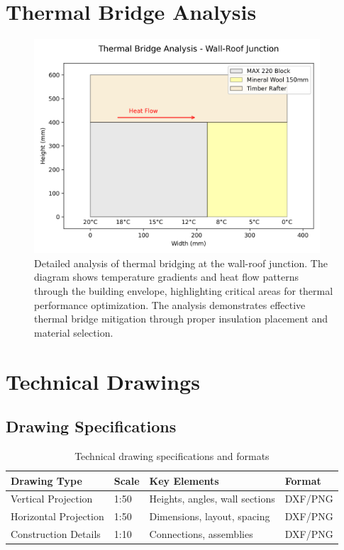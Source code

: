 \documentclass[12pt,a4paper]{article}
\begin{document}
\section{Thermal Bridge Analysis}
\begin{figure}[H]
    \centering
    \includegraphics[width=0.95\textwidth]{cad_project/enhanced_exports/screenshots/thermal_bridge.png}
    \caption{Detailed analysis of thermal bridging at the wall-roof junction.
    The diagram shows temperature gradients and heat flow patterns through the building envelope,
    highlighting critical areas for thermal performance optimization.
    The analysis demonstrates effective thermal bridge mitigation through proper insulation placement and material selection.}
    \label{fig:thermal_bridge}
\end{figure}

\section{Technical Drawings}

\subsection{Drawing Specifications}
\begin{table}[H]
    \centering
    \begin{tabular}{llll}
        \toprule
        \textbf{Drawing Type} & \textbf{Scale} & \textbf{Key Elements} & \textbf{Format} \\
        \midrule
        Vertical Projection & 1:50 & Heights, angles, wall sections & DXF/PNG \\
        Horizontal Projection & 1:50 & Dimensions, layout, spacing & DXF/PNG \\
        Construction Details & 1:10 & Connections, assemblies & DXF/PNG \\
        \bottomrule
    \end{tabular}
    \caption{Technical drawing specifications and formats}
    \label{tab:drawings}
\end{table}
\end{document}
